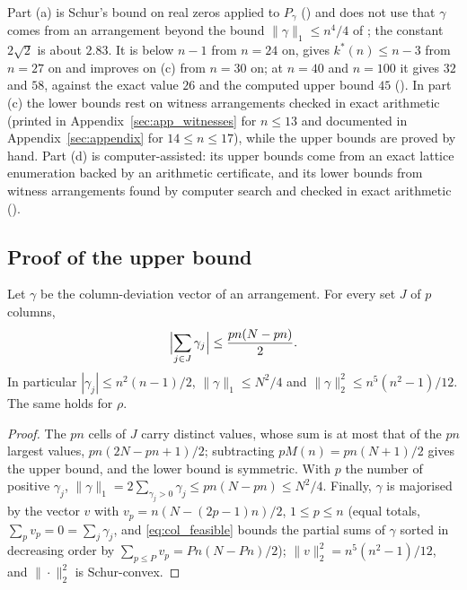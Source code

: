 Part (a) is Schur's bound on real zeros applied to $P_\gamma$ () and does not use that $\gamma$ comes from an arrangement beyond the bound $\|\gamma\|_1\le n^4/4$ of ; the constant $2\sqrt2$ is about $2.83$.
It is below $n-1$ from $n=24$ on, gives $k^*(n)\le n-3$ from $n=27$ on and improves on (c) from $n=30$ on; at $n=40$ and $n=100$ it gives $32$ and $58$, against the exact value $26$ and the computed upper bound $45$ ().
In part (c) the lower bounds rest on witness arrangements checked in exact arithmetic (printed in Appendix~\ref{sec:app_witnesses} for $n\le13$ and documented in Appendix~\ref{sec:appendix} for $14\le n\le17$), while the upper bounds are proved by hand.
Part (d) is computer-assisted: its upper bounds come from an exact lattice enumeration backed by an arithmetic certificate, and its lower bounds from witness arrangements found by computer search and checked in exact arithmetic ().

\subsection{Proof of the upper bound}
\label{sec:kstar_upper}

\begin{lemma}
\label{lem:col_feasible}
Let $\gamma$ be the column-deviation vector of an arrangement.  For every set $J$ of $p$ columns,
\begin{equation}
\Bigl|\sum_{j\in J}\gamma_j\Bigr|\le \frac{pn(N-pn)}{2}.
\label{eq:col_feasible}
\end{equation}
In particular $|\gamma_j|\le n^{2}(n-1)/2$, $\|\gamma\|_1\le N^{2}/4$ and $\|\gamma\|_2^2\le n^5(n^2-1)/12$.  The same holds for $\rho$.
\end{lemma}

\begin{proof}
The $pn$ cells of $J$ carry distinct values, whose sum is at most that of the $pn$ largest values, $pn(2N-pn+1)/2$; subtracting $pM(n)=pn(N+1)/2$ gives the upper bound, and the lower bound is symmetric.
With $p$ the number of positive $\gamma_j$, $\|\gamma\|_1=2\sum_{\gamma_j>0}\gamma_j\le pn(N-pn)\le N^2/4$.
Finally, $\gamma$ is majorised by the vector $v$ with $v_p=n(N-(2p-1)n)/2$, $1\le p\le n$ (equal totals, $\sum_pv_p=0=\sum_j\gamma_j$, and \eqref{eq:col_feasible} bounds the partial sums of $\gamma$ sorted in decreasing order by $\sum_{p\le P}v_p=Pn(N-Pn)/2$); $\|v\|_2^2=n^5(n^2-1)/12$, and $\|\cdot\|_2^2$ is Schur-convex.
\end{proof}

